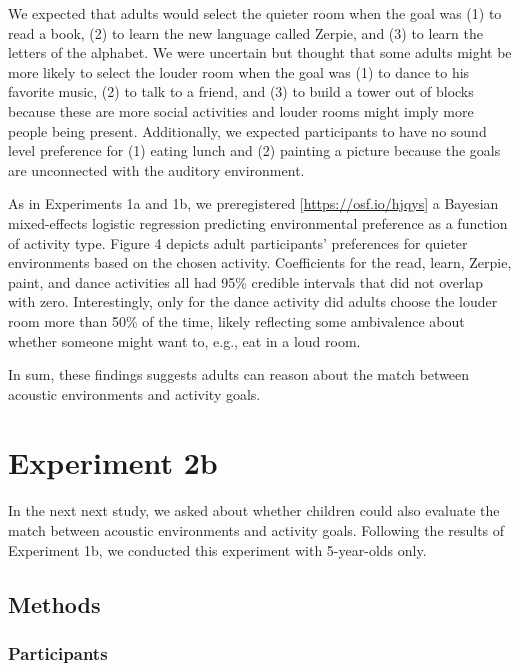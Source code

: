 \documentclass[10pt, letterpaper]{article}
\begin{document}
We expected that adults would select the quieter room when the goal was
(1) to read a book, (2) to learn the new language called Zerpie, and (3)
to learn the letters of the alphabet. We were uncertain but thought that
some adults might be more likely to select the louder room when the goal
was (1) to dance to his favorite music, (2) to talk to a friend, and (3)
to build a tower out of blocks because these are more social activities
and louder rooms might imply more people being present. Additionally, we
expected participants to have no sound level preference for (1) eating
lunch and (2) painting a picture because the goals are unconnected with
the auditory environment.

As in Experiments 1a and 1b, we preregistered
{[}\url{https://osf.io/hjqys}{]} a Bayesian mixed-effects logistic
regression predicting environmental preference as a function of activity
type. Figure 4 depicts adult participants' preferences for quieter
environments based on the chosen activity. Coefficients for the read,
learn, Zerpie, paint, and dance activities all had 95\% credible
intervals that did not overlap with zero. Interestingly, only for the
dance activity did adults choose the louder room more than 50\% of the
time, likely reflecting some ambivalence about whether someone might
want to, e.g., eat in a loud room.

In sum, these findings suggests adults can reason about the match
between acoustic environments and activity goals.

\hypertarget{experiment-2b}{%
\section{Experiment 2b}\label{experiment-2b}}

In the next next study, we asked about whether children could also
evaluate the match between acoustic environments and activity goals.
Following the results of Experiment 1b, we conducted this experiment
with 5-year-olds only.

\hypertarget{methods-3}{%
\subsection{Methods}\label{methods-3}}

\hypertarget{participants-3}{%
\subsubsection{Participants}\label{participants-3}}
\end{document}
